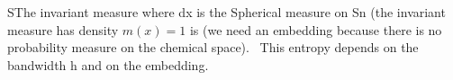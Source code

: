 SThe invariant measure where dx is the Spherical measure on Sn (the invariant measure has density $m(x)=1$ is (we need an embedding because there is no probability measure on the chemical space). 
This entropy depends on the bandwidth h and on the embedding.
